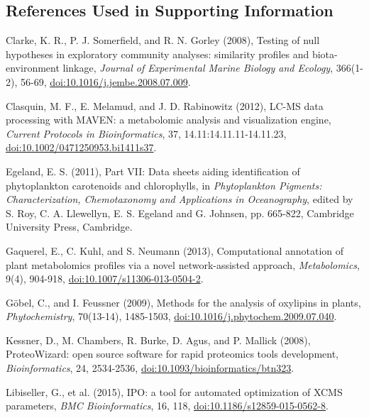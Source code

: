\begin{singlespace}
\section*{References Used in Supporting Information}
\addtocounter{section}{1}
{\setlength{\parindent}{0pt}
Clarke, K. R., P. J. Somerfield, and R. N. Gorley (2008), Testing of null hypotheses in exploratory community analyses: similarity profiles and biota-environment linkage, \emph{Journal of Experimental Marine Biology and Ecology}, 366(1-2), 56-69, \href{http://dx.doi.org/10.1016/j.jembe.2008.07.009}{doi:10.1016/j.jembe.2008.07.009}.

{\setlength{\parskip}{10pt}

Clasquin, M. F., E. Melamud, and J. D. Rabinowitz (2012), LC-MS data processing with MAVEN: a metabolomic analysis and visualization engine, \emph{Current Protocols in Bioinformatics}, 37, 14.11:14.11.11-14.11.23, \href{http://dx.doi.org/10.1002/0471250953.bi1411s37}{doi:10.1002/0471250953.bi1411s37}.

Egeland, E. S. (2011), Part VII: Data sheets aiding identification of phytoplankton carotenoids and chlorophylls, in \emph{Phytoplankton Pigments: Characterization, Chemotaxonomy and Applications in Oceanography}, edited by S. Roy, C. A. Llewellyn, E. S. Egeland and G. Johnsen, pp. 665-822, Cambridge University Press, Cambridge.

Gaquerel, E., C. Kuhl, and S. Neumann (2013), Computational annotation of plant metabolomics profiles via a novel network-assisted approach, \emph{Metabolomics}, 9(4), 904-918, \href{http://dx.doi.org/10.1007/s11306-013-0504-2}{doi:10.1007/s11306-013-0504-2}.

G\"{o}bel, C., and I. Feussner (2009), Methods for the analysis of oxylipins in plants, \emph{Phytochemistry}, 70(13-14), 1485-1503, \href{http://dx.doi.org/10.1016/j.phytochem.2009.07.040}{doi:10.1016/j.phytochem.2009.07.040}.

Kessner, D., M. Chambers, R. Burke, D. Agus, and P. Mallick (2008), ProteoWizard: open source software for rapid proteomics tools development, \emph{Bioinformatics}, 24, 2534-2536, \href{http://dx.doi.org/10.1093/bioinformatics/btn323}{doi:10.1093/bioinformatics/btn323}.

Libiseller, G., et al. (2015), IPO: a tool for automated optimization of XCMS parameters, \emph{BMC Bioinformatics}, 16, 118, \href{http://dx.doi.org/10.1186/s12859-015-0562-8}{doi:10.1186/s12859-015-0562-8}.

}}
\end{singlespace}
